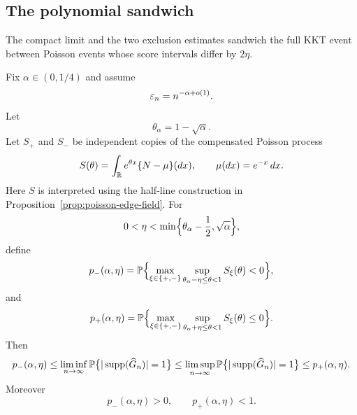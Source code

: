 \subsection{The polynomial sandwich}

The compact limit and the two exclusion estimates sandwich the full KKT event
between Poisson events whose score intervals differ by \(2\eta\).
\begin{theorem}
\label{thm:polynomial-stable-regime}
Fix $\alpha\in(0,1/4)$ and assume
\[
    \varepsilon_n=n^{-\alpha+o(1)}.
\]
Let
\[
    \theta_\alpha=1-\sqrt\alpha.
\]
Let $S_+$ and $S_-$ be independent copies of the compensated Poisson process
\[
    S(\theta)
    =
    \int_{\mathbb{R}} e^{\theta x}\{N-\mu\}(dx),
    \qquad
    \mu(dx)=e^{-x}\,dx.
\]
Here \(S\) is interpreted using the half-line construction in
Proposition~\ref{prop:poisson-edge-field}.
For
\[
    0<\eta<\min\Bigl\{\theta_\alpha-\frac12,\sqrt\alpha\Bigr\},
\]
define
\[
    p_-(\alpha,\eta)
    =
    \mathbb P\Bigl\{
        \max_{\xi\in\{+,-\}}
        \sup_{\theta_\alpha-\eta\le\theta<1}
        S_\xi(\theta)<0
    \Bigr\},
\]
and
\[
    p_+(\alpha,\eta)
    =
    \mathbb P\Bigl\{
        \max_{\xi\in\{+,-\}}
        \sup_{\theta_\alpha+\eta\le\theta<1}
        S_\xi(\theta)\le0
    \Bigr\}.
\]
Then
\[
    p_-(\alpha,\eta)
    \le
    \liminf_{n\to\infty}
    \mathbb P\bigl\{|\operatorname{supp}(\widehat G_n)|=1\bigr\}
    \le
    \limsup_{n\to\infty}
    \mathbb P\bigl\{|\operatorname{supp}(\widehat G_n)|=1\bigr\}
    \le
    p_+(\alpha,\eta).
\]
Moreover
\[
    p_-(\alpha,\eta)>0,
    \qquad
    p_+(\alpha,\eta)<1.
\]
\end{theorem}

